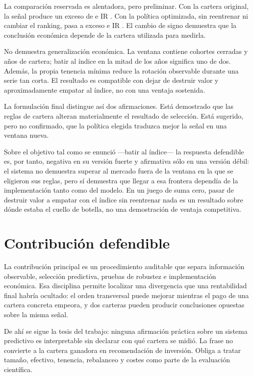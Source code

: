 La comparación reservada es alentadora, pero preliminar. Con la cartera original, la señal produce
un exceso de \ExcesoModeloReservado{} e IR \IRModeloReservado{}. Con la política optimizada, sin
reentrenar ni cambiar el ranking, pasa a exceso \ExcesoCarteraReservado{} e IR
\IRCarteraReservado{}. El cambio de signo demuestra que la conclusión económica depende de la
cartera utilizada para medirla.

No demuestra generalización económica. La ventana contiene \CohortesReservadas{} cohortes cerradas
y \AnosCarteraReservada{} años de cartera; batir al índice en la mitad de los años significa uno de
dos. Además, la propia tenencia mínima reduce la rotación observable durante una serie tan corta.
El resultado es compatible con dejar de destruir valor y aproximadamente empatar al índice, no con
una ventaja sostenida.

La formulación final distingue así dos afirmaciones. Está demostrado que las reglas de cartera
alteran materialmente el resultado de selección. Está sugerido, pero no confirmado, que la política
elegida traduzca mejor la señal en una ventana nueva.

Sobre el objetivo tal como se enunció ---batir al índice--- la respuesta defendible es, por tanto,
negativa en su versión fuerte y afirmativa sólo en una versión débil: el sistema no demuestra
superar al mercado fuera de la ventana en la que se eligieron sus reglas, pero sí demuestra que
llegar a esa frontera dependía de la implementación tanto como del modelo. En un juego de suma cero,
pasar de destruir valor a empatar con el índice sin reentrenar nada es un resultado sobre dónde
estaba el cuello de botella, no una demostración de ventaja competitiva.

\section{Contribución defendible}

La contribución principal es un procedimiento auditable que separa información observable,
selección predictiva, pruebas de robustez e implementación económica. Esa disciplina permite
localizar una divergencia que una rentabilidad final habría ocultado: el orden transversal puede
mejorar mientras el pago de una cartera concreta empeora, y dos carteras pueden producir
conclusiones opuestas sobre la misma señal.

De ahí se sigue la tesis del trabajo: ninguna afirmación práctica sobre un sistema predictivo es
interpretable sin declarar con qué cartera se midió. La frase no convierte a la
cartera ganadora en recomendación de inversión. Obliga a tratar tamaño, efectivo, tenencia,
rebalanceo y costes como parte de la evaluación científica.

